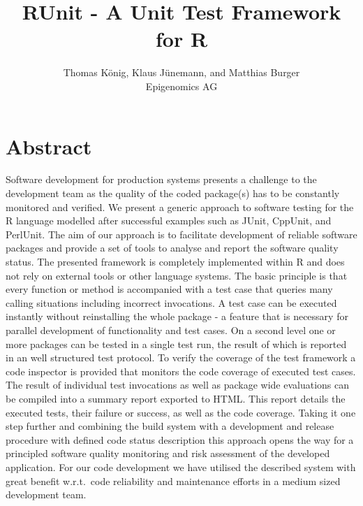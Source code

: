 \documentclass[12pt, a4paper]{article}
\begin{document}
\title{RUnit - A Unit Test Framework for R}
\author{Thomas K\"onig, Klaus J\"unemann, and Matthias Burger\\Epigenomics AG}
\maketitle
\tableofcontents
\section*{Abstract}
\label{section:abstract}
Software development for production systems presents a challenge to the development team as the quality of the coded package(s) has to be constantly monitored and verified. We present a generic approach to software testing for the R language modelled after successful examples such as JUnit, CppUnit, and PerlUnit. The aim of our approach is to facilitate development of reliable software packages and provide a set of tools to analyse and report the software quality status. The presented framework is completely implemented within R and does not rely on external tools or other language systems. The basic principle is that every function or method is accompanied with a test case that queries many calling situations including incorrect invocations. A test case can be executed instantly without reinstalling the whole package - a feature that is necessary for parallel development of functionality and test cases. On a second level one or more packages can be tested in a single test run, the result of which is reported in an well structured test protocol.
To verify the coverage of the test framework a code inspector is provided that monitors the code coverage of executed test cases. The result of individual test invocations as well as package wide evaluations can be compiled into a summary report exported to HTML. This report details the executed tests, their failure or success, as well as the code coverage. Taking it one step further and combining the build system with a development and release procedure with defined code status description this approach opens the way for a principled software quality monitoring and risk assessment of the developed application.
For our code development we have utilised the described system with great benefit w.r.t.\ code reliability and maintenance efforts in a medium sized development team.
\end{document}
